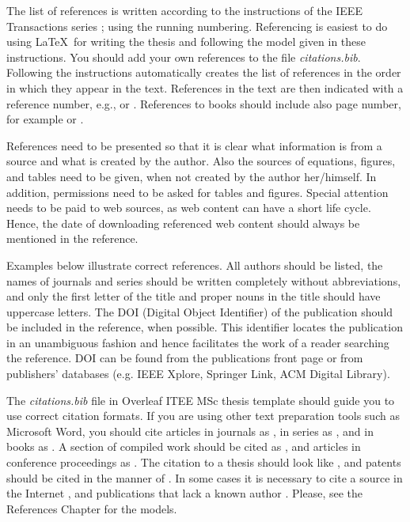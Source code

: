 The list of references is written according to the instructions of the IEEE Transactions series \cite{ieeetransactions}; using the running numbering. Referencing is easiest to do using \LaTeX\ for writing the thesis and following the model given in these instructions. You should add your own references to the file \textit{citations.bib}. Following the instructions automatically creates the list of references in the order in which they appear in the text. References in the text are then indicated with a reference number, e.g., \cite{lappalainen} or \cite{lappalainen, acta, korpela}. References to books should include also page number, for example \cite[p.15]{lappalainen} or \cite[p.15-17]{lappalainen}.

References need to be presented so that it is clear what information is from a source and what is created by the author. Also the sources of equations, figures, and tables need to be given, when not created by the author her/himself. In addition, permissions need to be asked for tables and figures. Special attention needs to be paid to web sources, as web content can have a short life cycle. Hence, the date of downloading referenced web content should always be mentioned in the reference.

Examples below illustrate correct references. All authors should be listed, the names of journals and series should be written completely without abbreviations, and only the first letter of the title and proper nouns in the title should have uppercase letters. The DOI (Digital Object Identifier) of the publication should be included in the reference, when possible. This identifier locates the publication in an unambiguous fashion and hence facilitates the work of a reader searching the reference. DOI can be found from the publications front page or from publishers’ databases (e.g. IEEE Xplore, Springer Link, ACM Digital Library).

The \textit{citations.bib} file in Overleaf ITEE MSc thesis template should guide you to use correct citation formats. If you are using other text preparation tools such as Microsoft Word, you should cite articles in journals  as \cite{ojala:2002}, in series as \cite{riekki:1998}, and in books as \cite{pietikainen:2011}. A section of compiled work should be cited as \cite{cvejic:2005}, and articles in conference proceedings as  \cite{heikkila:1997}. The citation to a thesis should look like \cite{heikkinen:2011}, and patents should be cited in the manner of  \cite{toivonen:2004}. In some cases it is necessary to cite a source in the Internet \cite{roning:2011}, and publications that lack a known author \cite{asumistaso:1991}. Please, see the References Chapter for the models.


